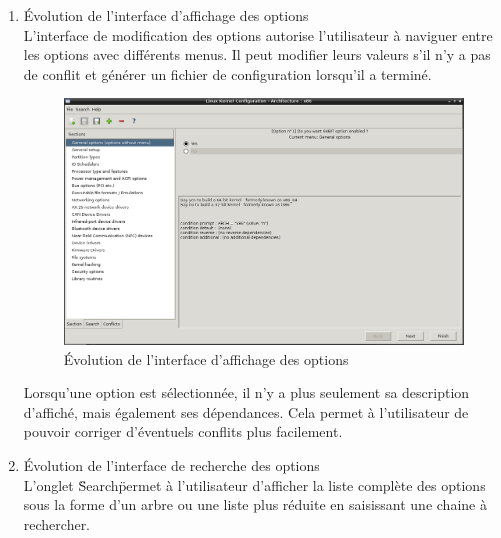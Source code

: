 \documentclass[16pts]{report}
\begin{document}
\begin{enumerate}
	\pagebreak	

	\item Évolution de l'interface d'affichage des options
	\\

	L'interface de modification des options autorise l'utilisateur à naviguer 
	entre les options avec différents menus. Il peut modifier leurs valeurs 
	s'il n'y a pas de conflit et générer un fichier de configuration lorsqu'il 
	a terminé.

	\begin{figure}[H]
		\includegraphics[scale=0.5]{./illustrations/screen_options_interface.png}
		\centering
		\caption{Évolution de l'interface d'affichage des options}
		\label{fig:Evo_config}
	\end{figure}

	Lorsqu'une option est sélectionnée, il n'y a plus seulement sa description d'affiché, mais également ses dépendances. Cela permet à l'utilisateur de 
	pouvoir corriger d'éventuels conflits plus facilement.

	\pagebreak	

	\item Évolution de l'interface de recherche des options
	\\

	L'onglet \"Search\" permet à l'utilisateur d'afficher la liste complète 
	des options sous la forme d'un arbre ou une liste plus réduite en 
	saisissant une chaine à rechercher.


\end{enumerate}
\end{document}

